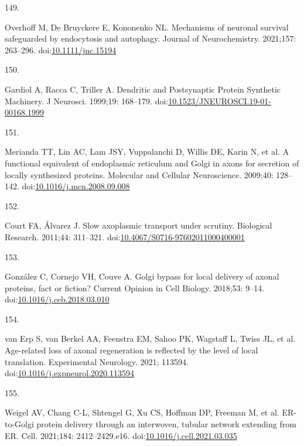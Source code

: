\documentclass[
  12pt,
  a4paper,
]{book}
\newlength{\cslhangindent}
\newlength{\csllabelwidth}
\newlength{\cslentryspacingunit} %
\newenvironment{CSLReferences}[2] %
 {%
  \setlength{\parindent}{0pt}
  \ifodd #1
  \let\oldpar\par
  \def\par{\hangindent=\cslhangindent\oldpar}
  \fi
  \setlength{\parskip}{#2\cslentryspacingunit}
 }%
 {}
\newcommand{\CSLLeftMargin}[1]{\parbox[t]{\csllabelwidth}{#1}}
\newcommand{\CSLRightInline}[1]{\parbox[t]{\linewidth - \csllabelwidth}{#1}\break}
\begin{document}
\begin{CSLReferences}{0}{0}
\leavevmode{}%
\CSLLeftMargin{149. }%
\CSLRightInline{Overhoff M, De Bruyckere E, Kononenko NL. Mechanisms of neuronal survival safeguarded by endocytosis and autophagy. Journal of Neurochemistry. 2021;157: 263--296. doi:\href{https://doi.org/10.1111/jnc.15194}{10.1111/jnc.15194}}

\leavevmode{}%
\CSLLeftMargin{150. }%
\CSLRightInline{Gardiol A, Racca C, Triller A. Dendritic and {Postsynaptic Protein Synthetic Machinery}. J Neurosci. 1999;19: 168--179. doi:\href{https://doi.org/10.1523/JNEUROSCI.19-01-00168.1999}{10.1523/JNEUROSCI.19-01-00168.1999}}

\leavevmode{}%
\CSLLeftMargin{151. }%
\CSLRightInline{Merianda TT, Lin AC, Lam JSY, Vuppalanchi D, Willis DE, Karin N, et al. A functional equivalent of endoplasmic reticulum and {Golgi} in axons for secretion of locally synthesized proteins. Molecular and Cellular Neuroscience. 2009;40: 128--142. doi:\href{https://doi.org/10.1016/j.mcn.2008.09.008}{10.1016/j.mcn.2008.09.008}}

\leavevmode{}%
\CSLLeftMargin{152. }%
\CSLRightInline{Court FA, Álvarez J. Slow axoplasmic transport under scrutiny. Biological Research. 2011;44: 311--321. doi:\href{https://doi.org/10.4067/S0716-97602011000400001}{10.4067/S0716-97602011000400001}}

\leavevmode{}%
\CSLLeftMargin{153. }%
\CSLRightInline{González C, Cornejo VH, Couve A. Golgi bypass for local delivery of axonal proteins, fact or fiction? Current Opinion in Cell Biology. 2018;53: 9--14. doi:\href{https://doi.org/10.1016/j.ceb.2018.03.010}{10.1016/j.ceb.2018.03.010}}

\leavevmode{}%
\CSLLeftMargin{154. }%
\CSLRightInline{van Erp S, van Berkel AA, Feenstra EM, Sahoo PK, Wagstaff L, Twiss JL, et al. Age-related loss of axonal regeneration is reflected by the level of local translation. Experimental Neurology. 2021; 113594. doi:\href{https://doi.org/10.1016/j.expneurol.2020.113594}{10.1016/j.expneurol.2020.113594}}

\leavevmode{}%
\CSLLeftMargin{155. }%
\CSLRightInline{Weigel AV, Chang C-L, Shtengel G, Xu CS, Hoffman DP, Freeman M, et al. {ER-to-Golgi} protein delivery through an interwoven, tubular network extending from {ER}. Cell. 2021;184: 2412--2429.e16. doi:\href{https://doi.org/10.1016/j.cell.2021.03.035}{10.1016/j.cell.2021.03.035}}


\end{CSLReferences}
\end{document}
